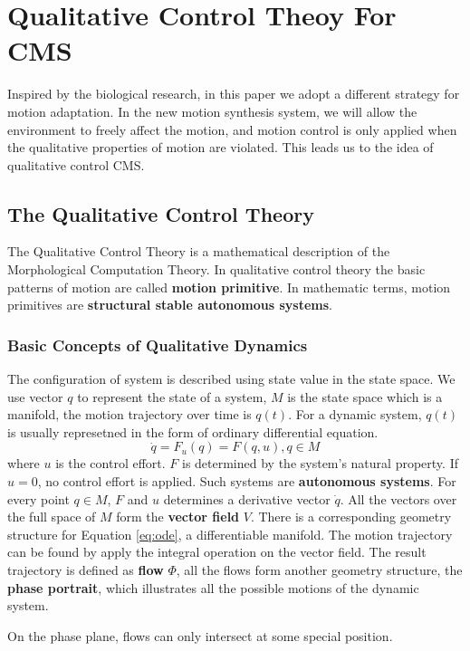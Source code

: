 \section{Qualitative Control Theoy For CMS}
Inspired by the biological research, in this paper we adopt a different strategy for motion adaptation. In the new motion synthesis system, we will allow the environment to freely affect the motion, and motion control is only applied when the qualitative properties of motion are violated. This leads us to the idea of qualitative control CMS. 

\subsection{The Qualitative Control Theory}
The Qualitative Control Theory is a mathematical description of the Morphological Computation Theory.
In qualitative control theory the  basic patterns of motion are called \textbf{motion primitive}.
In mathematic terms, motion primitives are \textbf{structural stable autonomous systems}.

\subsubsection{Basic Concepts of Qualitative Dynamics} 
The configuration of system is described using state value in the state space.
We use vector $q$ to represent the state of a system,  $M$ is the state space which is a manifold,
the motion trajectory over time is $q(t)$.
For a dynamic system, $q(t)$ is usually represetned in the form of  ordinary differential equation. 
\begin{equation}
\dot{q}=F_{u}(q)=F(q,u),q\in M
\label{eq:ode}
\end{equation}
where $u$ is the control effort. 
$F$ is determined by the system's natural property.
If $u=0$,  no control effort is applied.
Such systems are \textbf{autonomous systems}.
For every point $q \in M$, 
$F$ and $u$ determines a derivative vector $\dot{q}$. 
All the vectors over the full space of $M$ form the \textbf{vector field} $V$. 
There is a corresponding geometry structure for Equation \eqref{eq:ode}, a differentiable manifold.
The motion trajectory can be found by apply the integral operation on the vector field.
The result trajectory is defined as \textbf{flow} $\Phi$, all the flows form another geometry structure,
the \textbf{phase portrait}, which illustrates all the possible motions of the dynamic system.


On the phase plane, flows can only intersect at some special position.


